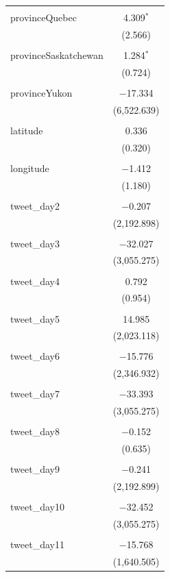 \documentclass{article}
\begin{document}
\begin{longtable}{@{\extracolsep{10pt}}lc}
  & \\ 
 provinceQuebec & 4.309$^{*}$ \\ 
  & (2.566) \\ 
  & \\ 
 provinceSaskatchewan & 1.284$^{*}$ \\ 
  & (0.724) \\ 
  & \\ 
 provinceYukon & $-$17.334 \\ 
  & (6,522.639) \\ 
  & \\ 
 latitude & 0.336 \\ 
  & (0.320) \\ 
  & \\ 
 longitude & $-$1.412 \\ 
  & (1.180) \\ 
  & \\ 
 tweet\_day2 & $-$0.207 \\ 
  & (2,192.898) \\ 
  & \\ 
 tweet\_day3 & $-$32.027 \\ 
  & (3,055.275) \\ 
  & \\ 
 tweet\_day4 & 0.792 \\ 
  & (0.954) \\ 
  & \\ 
 tweet\_day5 & 14.985 \\ 
  & (2,023.118) \\ 
  & \\ 
 tweet\_day6 & $-$15.776 \\ 
  & (2,346.932) \\ 
  & \\ 
 tweet\_day7 & $-$33.393 \\ 
  & (3,055.275) \\ 
  & \\ 
 tweet\_day8 & $-$0.152 \\ 
  & (0.635) \\ 
  & \\ 
 tweet\_day9 & $-$0.241 \\ 
  & (2,192.899) \\ 
  & \\ 
 tweet\_day10 & $-$32.452 \\ 
  & (3,055.275) \\ 
  & \\ 
 tweet\_day11 & $-$15.768 \\ 
  & (1,640.505) \\ 

\end{longtable}
\end{document}
